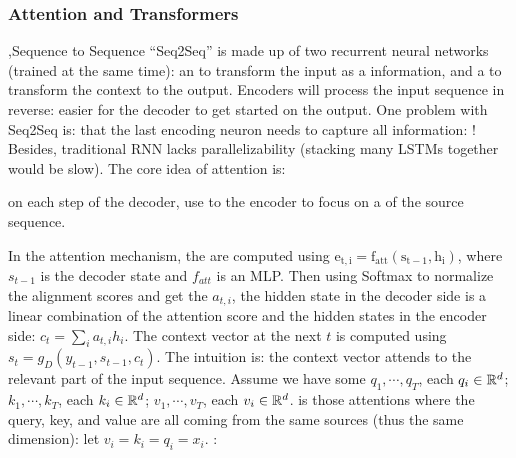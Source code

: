 \documentclass[10pt]{report}
\begin{document}
\subsubsection{Attention and Transformers}
\sep{Sequence to Sequence}
``Seq2Seq'' is made up of two recurrent neural networks (trained at the same time): an  to transform the input as a  information, and a  to transform the context to the output. Encoders will process the input sequence in reverse: easier for the decoder to get started on the output. One problem with Seq2Seq is: that the last encoding neuron needs to capture all information: ! Besides, traditional RNN lacks parallelizability (stacking many LSTMs together would be slow).
The core idea of attention is:
\begin{center}
    on each step of the decoder, use  to the encoder to focus on a  of the source sequence.
\end{center}
In the attention mechanism, the  are computed using $\mathrm{e_{t,i}=f_{att}(s_{t-1},h_i)}$, where $s_{t-1}$ is the decoder state and $f_{att}$ is an MLP. Then using Softmax to normalize the alignment scores and get the  $a_{t,i}$, the hidden state in the decoder side is a linear combination of the attention score and the hidden states in the encoder side: $c_t=\sum_i a_{t,i}h_i$. The context vector at the next $t$ is computed using $s_t=g_D(y_{t-1},s_{t-1},c_t)$. The intuition is: the context vector attends to the relevant part of the input sequence.
Assume we have some  $q_1,\cdots,q_T$, each $q_i\in \RR^d$;  $k_1,\cdots,k_T$, each $k_i\in \RR^d$;  $v_1,\cdots,v_T$, each $v_i\in \RR^d$.  is those attentions where the query, key, and value are all coming from the same sources (thus the same dimension): let $v_i=k_i=q_i=x_i$. :
\end{document}
